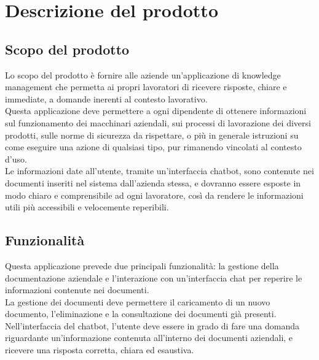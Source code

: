 \chapter{Descrizione del prodotto} \label{cap:descr}
\section{Scopo del prodotto}
Lo scopo del prodotto è fornire alle aziende un’applicazione di knowledge management che permetta ai propri lavoratori di ricevere risposte, chiare e immediate, a domande inerenti al contesto lavorativo.\\
Questa applicazione deve permettere a ogni dipendente di ottenere informazioni sul funzionamento dei macchinari aziendali, sui processi di lavorazione dei diversi prodotti, sulle norme di sicurezza da rispettare, o più in generale istruzioni su come eseguire una azione di qualsiasi tipo, pur rimanendo vincolati al contesto d’uso.\\
Le informazioni date all'utente, tramite un’interfaccia chatbot, sono contenute nei documenti inseriti nel sistema dall’azienda stessa, e dovranno essere esposte in modo chiaro e comprensibile ad ogni lavoratore, così da rendere le informazioni utili più accessibili e velocemente reperibili.


\section{Funzionalità}
Questa applicazione prevede due principali funzionalità: la gestione della documentazione aziendale e l’interazione con un’interfaccia chat per reperire le informazioni contenute nei documenti.\\
La gestione dei documenti deve permettere il caricamento di un nuovo documento, l’eliminazione e la consultazione dei documenti già presenti.\\
Nell’interfaccia del chatbot, l’utente deve essere in grado di fare una domanda riguardante un’informazione contenuta all’interno dei documenti aziendali, e ricevere una risposta corretta, chiara ed esaustiva.


